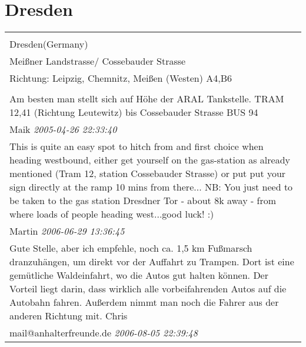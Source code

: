 \documentclass[a4paper,12pt]{article}
\begin{document}
\section{Dresden}
\begin{tabular}{|p{13cm}|}
\hline\\
Dresden(Germany)\\
Meißner Landstrasse/ Cossebauder Strasse\\
Richtung: Leipzig, Chemnitz, Meißen (Westen) A4,B6 \\
\hline\\
Am besten man stellt sich auf Höhe der ARAL Tankstelle.
TRAM 12,41 (Richtung Leutewitz) bis Cossebauder Strasse
BUS 94 \\
Maik \textit{ 2005-04-26 22:33:40 }\\\hline This is quite an easy spot to hitch from and first choice when heading westbound, either get yourself on the gas-station as already mentioned (Tram 12, station Cossebauder Strasse) or put put your sign directly at the ramp 10 mins from there...
NB: You just need to be taken to the gas station Dresdner Tor - about 8k away - from where loads of people heading west...good luck! :) \\
Martin \textit{ 2006-06-29 13:36:45 }\\\hline Gute Stelle, aber ich empfehle, noch ca. 1,5 km Fußmarsch dranzuhängen, um direkt vor der Auffahrt zu Trampen. Dort ist eine gemütliche Waldeinfahrt, wo die Autos gut halten können. Der Vorteil liegt darin, dass wirklich alle vorbeifahrenden Autos auf die Autobahn fahren. Außerdem nimmt man noch die Fahrer aus der anderen Richtung mit.
Chris \\
mail@anhalterfreunde.de \textit{ 2006-08-05 22:39:48 }\\\hline
\end{tabular}
\end{document}
